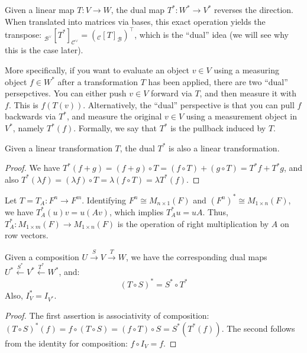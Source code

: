 \documentclass[../linear_algebra_and_groups.tex]{subfiles}
\begin{document}
\begin{remark}
    Given a linear map $T: V \to W$, the dual map $T^*: W^* \to V^*$ reverses the direction. When translated into matrices via bases, this exact operation yields the transpose: ${}_{\mathcal{B}^\vee}[T^*]_{\mathcal{C}^\vee} = ({}_{\mathcal{C}}[T]_{\mathcal{B}})^\top$, which is the ``dual'' idea (we will see why this is the case later).

    More specifically, if you want to evaluate an object $v\in V$ using a measuring object $f\in W^*$ after a transformation $T$ has been applied, there are two ``dual'' persepctives. You can either push $v\in V$ forward via $T$, and then measure it with $f$. This is $f(T(v))$.
    Alternatively, the ``dual'' perspective is that you can pull $f$ backwards via $T^*$, and measure the original $v\in V$ using a measurement object in $V^*$, namely $T^*(f)$. Formally, we say that $T^*$ is the pullback induced by $T$. 
\end{remark}

\begin{proposition}
    \begin{shaded*}
    Given a linear transformation $T$, the dual $T^*$ is also a linear transformation.
    \end{shaded*}
\end{proposition}
\begin{proof}
    We have $T^*(f+g) = (f+g) \circ T = (f \circ T) + (g \circ T) = T^*f + T^*g$, and also $T^*(\lambda f) = (\lambda f) \circ T = \lambda(f \circ T) = \lambda T^*(f)$.
    \qedhere
\end{proof}

\begin{example}
    Let $T = T_A : F^n \to F^m$. Identifying $F^n \cong M_{n\times 1}(F)$ and $(F^n)^* \cong M_{1\times n}(F)$, we have $T_A^*(u)v = u(Av)$, which implies $T_A^* u = uA$. Thus, $T_A^* : M_{1\times m}(F) \to M_{1\times n}(F)$ is the operation of right multiplication by $A$ on row vectors.
\end{example}

\begin{proposition}
    \begin{shaded*}
    Given a composition $U \xrightarrow{S} V \xrightarrow{T} W$, we have the corresponding dual maps $U^* \xleftarrow{S^*} V^* \xleftarrow{T^*} W^*$, and:
    \[ (T \circ S)^* = S^* \circ T^* \]
    Also, $I_V^* = I_{V^*}$.
    \end{shaded*}
\end{proposition}
\begin{proof}
    The first assertion is associativity of composition: $(T \circ S)^*(f) = f \circ (T \circ S) = (f \circ T) \circ S = S^*(T^*(f))$. The second follows from the identity for composition: $f \circ I_V = f$.
    \qedhere
\end{proof}
\end{document}
